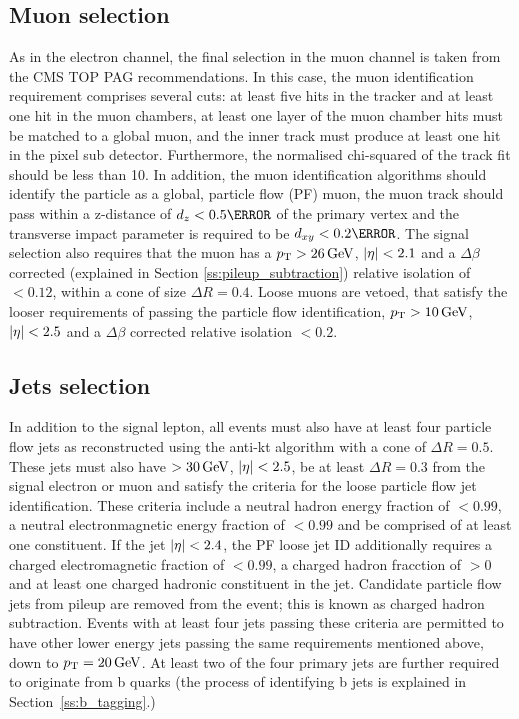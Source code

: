 \subsection{Muon selection}
\label{muonplusjetschannelselection}
As in the electron channel, the final selection in the muon channel is taken from the CMS TOP PAG
recommendations. In this case, the muon identification requirement comprises several cuts: at least five hits
in the tracker and at least one hit in the muon chambers, at least one layer of the muon chamber hits must be
matched to a global muon, and the inner track must produce at least one hit in the pixel sub detector.
Furthermore, the normalised chi-squared of the track fit should be less than 10. In addition, the muon
identification algorithms should identify the particle as a global, particle flow (PF) muon, the muon track
should pass within a z-distance of $d_{z} < 0.5\cm$ of the primary vertex and the transverse impact parameter
is required to be $d_{xy} < 0.2\cm$. The signal selection also requires that the muon has a $p_{\mathrm{T}} > 26\,\text{Ge\hspace{-.08em}V}$,
$|\eta| < 2.1$ and a $\Delta\beta$ corrected (explained in Section \ref{ss:pileup_subtraction}) relative
isolation of $< 0.12$, within a cone of size $\Delta R = 0.4$. Loose muons are vetoed, that satisfy the looser
requirements of passing the particle flow identification, $p_{\mathrm{T}} > 10\,\text{Ge\hspace{-.08em}V}$, $|\eta| < 2.5$ and a $\Delta\beta$
corrected relative isolation $<0.2$.

\subsection{Jets selection}
\label{jets_selection}
In addition to the signal lepton, all events must also have at least four particle flow jets as reconstructed
using the anti-kt algorithm \cite{Cacciari:2008gp} with a cone of $\Delta R = 0.5$. These jets must also have
\pt $> 30\,\text{Ge\hspace{-.08em}V}$, $|\eta| < 2.5$, be at least $\Delta R = 0.3$ from the signal electron or muon and satisfy the
criteria for the loose particle flow jet identification. These criteria include a neutral hadron energy
fraction of $<0.99$, a neutral electronmagnetic energy fraction of $<0.99$ and be comprised of at least one
constituent. If the jet $|\eta| < 2.4$, the PF loose jet ID additionally requires a charged electromagnetic
fraction of $<0.99$, a charged hadron fracction of $> 0$ and at least one charged hadronic constituent in the
jet. Candidate particle flow jets from pileup are removed from the event; this is known as charged hadron
subtraction. Events with at least four jets passing these criteria are permitted to have other lower energy
jets passing the same requirements mentioned above, down to $p_{\mathrm{T}} = 20\,\text{Ge\hspace{-.08em}V}$. At least two of the four primary
jets are further required to originate from b quarks (the process of identifying b jets is explained in
Section~\ref{ss:b_tagging}.)

